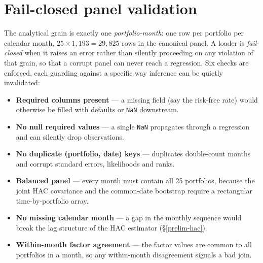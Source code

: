 \hypertarget{fail-closed-panel-validation}{%
\section{Fail-closed panel
validation}\label{fail-closed-panel-validation}}

The analytical grain is exactly one \emph{portfolio-month}: one row per
portfolio per calendar month, $25\times1{,}193 = 29{,}825$ rows in the
canonical panel. A loader is \emph{fail-closed} when it raises an error
rather than silently proceeding on any violation of that grain, so that a
corrupt panel can never reach a regression. Six checks are enforced, each
guarding against a specific way inference can be quietly invalidated:
\begin{itemize}
\tightlist
\item
  \textbf{Required columns present} --- a missing field (say the risk-free
  rate) would otherwise be filled with defaults or \texttt{NaN} downstream.
\item
  \textbf{No null required values} --- a single \texttt{NaN} propagates
  through a regression and can silently drop observations.
\item
  \textbf{No duplicate (portfolio, date) keys} --- duplicates double-count
  months and corrupt standard errors, likelihoods and ranks.
\item
  \textbf{Balanced panel} --- every month must contain all 25 portfolios,
  because the joint HAC covariance and the common-date bootstrap require a
  rectangular time-by-portfolio array.
\item
  \textbf{No missing calendar month} --- a gap in the monthly sequence
  would break the lag structure of the HAC estimator (\S\ref{prelim-hac}).
\item
  \textbf{Within-month factor agreement} --- the factor values are common
  to all portfolios in a month, so any within-month disagreement signals a
  bad join.
\end{itemize}

